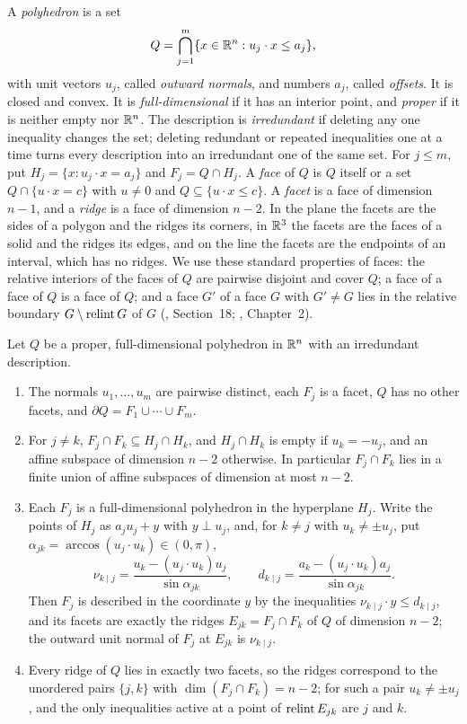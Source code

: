 A \emph{polyhedron} is a set
\[
 Q=\bigcap_{j=1}^m\{x\in\mathbb R^n:u_j\cdot x\le a_j\},
\]
with unit vectors \(u_j\), called \emph{outward normals}, and numbers
\(a_j\), called \emph{offsets}. It is closed and convex. It is
\emph{full-dimensional} if it has an interior point, and \emph{proper} if it
is neither empty nor \(\mathbb R^n\). The description is \emph{irredundant} if
deleting any one inequality changes the set; deleting redundant or repeated
inequalities one at a time turns every description into an irredundant one
of the same set. For \(j\le m\), put \(H_j=\{x:u_j\cdot x=a_j\}\) and
\(F_j=Q\cap H_j\). A \emph{face} of \(Q\) is \(Q\) itself or a set
\(Q\cap\{u\cdot x=c\}\) with \(u\ne0\) and \(Q\subseteq\{u\cdot x\le c\}\).
A \emph{facet} is a face of dimension \(n-1\), and a \emph{ridge} is a face
of dimension \(n-2\). In the plane the facets are the sides of a polygon
and the ridges its corners, in \(\mathbb R^3\) the facets are the faces of a solid
and the ridges its edges, and on the line the facets are the endpoints of an
interval, which has no ridges. We use these standard properties of faces:
the relative interiors of the faces of \(Q\) are pairwise disjoint and cover
\(Q\); a face of a face of \(Q\) is a face of \(Q\); and a face \(G'\)
of a face \(G\) with \(G'\ne G\) lies in the relative boundary
\(G\setminus\operatorname{relint} G\) of \(G\) (, Section~18; , Chapter~2).

\begin{fact}\label{tb:facets}
Let \(Q\) be a proper, full-dimensional polyhedron in \(\mathbb R^n\) with an
irredundant description.
\begin{enumerate}
\item[(a)] The normals \(u_1,\ldots,u_m\) are pairwise distinct, each
\(F_j\) is a facet, \(Q\) has no other facets, and
\(\partial Q=F_1\cup\cdots\cup F_m\).
\item[(b)] For \(j\ne k\), \(F_j\cap F_k\subseteq H_j\cap H_k\), and
\(H_j\cap H_k\) is empty if \(u_k=-u_j\), and an affine subspace of
dimension \(n-2\) otherwise. In particular \(F_j\cap F_k\) lies in a
finite union of affine subspaces of dimension at most \(n-2\).
\item[(c)] Each \(F_j\) is a full-dimensional polyhedron in the hyperplane
\(H_j\). Write the points of \(H_j\) as \(a_ju_j+y\) with \(y\perp u_j\), and,
for \(k\ne j\) with \(u_k\ne\pm u_j\), put
\(\alpha_{jk}=\arccos(u_j\cdot u_k)\in(0,\pi)\),
\[
 \nu_{k\mid j}=\frac{u_k-(u_j\cdot u_k)u_j}{\sin\alpha_{jk}},\qquad
 d_{k\mid j}=\frac{a_k-(u_j\cdot u_k)a_j}{\sin\alpha_{jk}} .
\]
Then \(F_j\) is described in the coordinate \(y\) by the inequalities
\(\nu_{k\mid j}\cdot y\le d_{k\mid j}\), and its facets are exactly the
ridges \(E_{jk}=F_j\cap F_k\) of \(Q\) of dimension \(n-2\); the outward
unit normal of \(F_j\) at \(E_{jk}\) is \(\nu_{k\mid j}\).
\item[(d)] Every ridge of \(Q\) lies in exactly two facets, so the ridges
correspond to the unordered pairs \(\{j,k\}\) with
\(\dim(F_j\cap F_k)=n-2\); for such a pair \(u_k\ne\pm u_j\), and the
only inequalities active at a point of \(\operatorname{relint} E_{jk}\) are \(j\) and \(k\).
\end{enumerate}
\end{fact}

